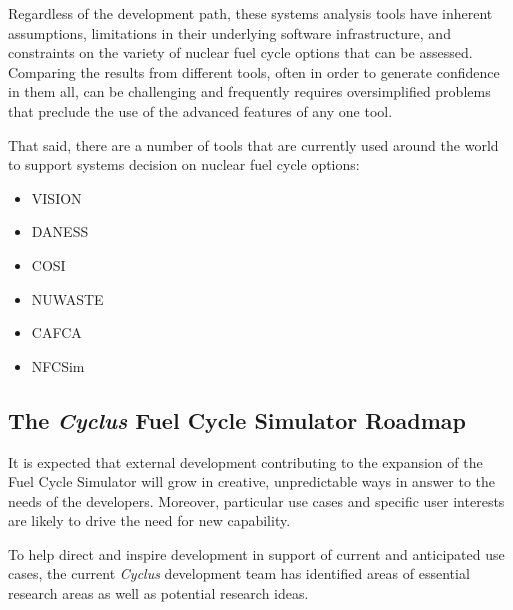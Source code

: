\documentclass[letterpaper,10pt,english]{sphinxmanual}
\begin{document}
Regardless of the development path, these systems analysis tools have
inherent assumptions, limitations in their underlying software
infrastructure, and constraints on the variety of nuclear fuel cycle
options that can be assessed.  Comparing the results from different
tools, often in order to generate confidence in them all, can be
challenging and frequently requires oversimplified problems that
preclude the use of the advanced features of any one tool.

That said, there are a number of tools that are currently used around
the world to support systems decision on nuclear fuel cycle options:
\begin{itemize}
\item {} 
VISION

\item {} 
DANESS

\item {} 
COSI

\item {} 
NUWASTE

\item {} 
CAFCA

\item {} 
NFCSim

\end{itemize}


\subsection{The \emph{Cyclus} Fuel Cycle Simulator Roadmap}
\label{basics/roadmap:the-cyclus-fuel-cycle-simulator-roadmap}\label{basics/roadmap::doc}
It is expected that external development contributing to the expansion
of the Fuel Cycle Simulator will grow in creative, unpredictable ways
in answer to the needs of the developers.  Moreover, particular use
cases and specific user interests are likely to drive the need for new
capability.

To help direct and inspire development in support of current and anticipated
use cases, the current \emph{Cyclus} development team has identified areas of
essential research areas as well as potential research ideas.
\end{document}
